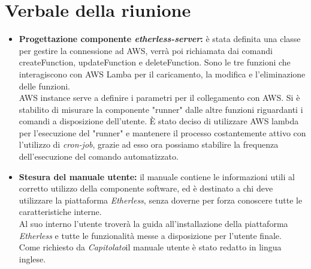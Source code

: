 \section{Verbale della riunione}
	\begin{itemize}
		\item \textbf{Progettazione componente \textit{etherless-server}:} 
		è stata definita una classe per gestire la connessione ad AWS, verrà poi richiamata dai comandi createFunction, updateFunction e deleteFunction. Sono le tre funzioni che interagiscono con AWS Lamba per il caricamento, la modifica e l'eliminazione delle funzioni.\\
		AWS instance serve a definire i parametri per il collegamento con AWS.
		Si è stabilito di misurare la componente "runner" dalle altre funzioni riguardanti i comandi a disposizione dell'utente.
		È stato deciso di utilizzare AWS lambda per l'esecuzione del "runner" e mantenere il processo costantemente attivo con l'utilizzo di \textit{cron-job\glos}, grazie ad esso ora possiamo stabilire la frequenza dell'esecuzione del comando automatizzato.
		
		\item \textbf{Stesura del manuale utente:} 
		il manuale contiene le informazioni utili al corretto utilizzo della componente software, ed è destinato a chi deve utilizzare la piattaforma \textit{Etherless}, senza doverne per forza conoscere tutte le caratteristiche interne.\\
		Al suo interno l'utente troverà la guida all'installazione della piattaforma \textit{Etherless} e tutte le funzionalità messe a disposizione per l'utente finale.\\
		Come richiesto da \textit{Capitolato}\glo il manuale utente è stato redatto in lingua inglese.
		
	\end{itemize}